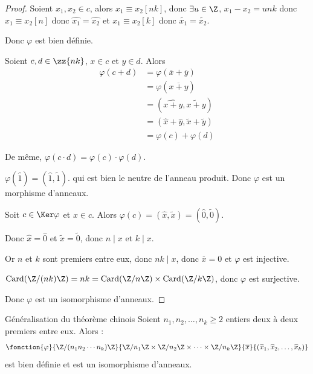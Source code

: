 \begin{proof}
    Soient $x_1, x_2 \in c$, alors $x_1 \equiv x_2 [nk]$, donc $\exists u \in \Z$, 
    $x_1 - x_2 = unk$ donc $x_1 \equiv x_2 [n]$ donc $\widehat{x_1} = \widehat{x_2}$ 
    et $x_1 \equiv x_2 [k]$ donc $\widetilde{x_1} = \widetilde{x_2}$.

    Donc $\varphi$ est bien définie.

    \avspace Soient $c, d \in \zz {nk}$, $x \in c$ et $y \in d$. Alors 
    \begin{align*}
        \varphi(c + d) & = \varphi(\overline x + \overline y) \\
        & = \varphi(\overline{x + y}) \\
        & = (\widehat{x + y}, \widetilde{x + y}) \\
        & = (\widehat x + \widehat y, \widetilde x + \widetilde y) \\
        & = \varphi(c) + \varphi(d)
    \end{align*}

    De même, $\varphi(c \cdot d) = \varphi(c) \cdot \varphi(d)$.

    $\varphi(\widehat 1) = (\widehat 1, \widetilde 1)$. qui est bien le neutre de l'anneau 
    produit. Donc $\varphi$ est un morphisme d'anneaux.

    \lvspace Soit $c \in \Ker \varphi$ et $x \in c$. 
    Alors $\varphi(c) = (\widehat x, \widetilde x) = (\widehat 0, \widetilde 0)$.

    Donc $\widehat x = \widehat 0$ et $\widetilde x = \widetilde 0$, donc $n \mid x $ et $k \mid x$.

    Or $n$ et $k$ sont premiers entre eux, donc $nk \mid x$, donc $\overline x = 0$ et 
    $\varphi$ est injective.

    $\operatorname{Card}(\Z / (nk) \Z) = nk = \operatorname{Card}(\Z / n \Z) \times \operatorname{Card}(\Z / k \Z)$, donc
    $\varphi$ est surjective.

    Donc $\varphi$ est un isomorphisme d'anneaux.
\end{proof}

\begin{proposition}{Généralisation du théorème chinois}{}
    Soient $n_1, n_2, \ldots, n_k \geqslant 2$ entiers deux à deux premiers entre eux. 
    Alors : \[\fonction{\varphi}{\Z / (n_1 n_2 \cdots n_k) \Z}{\Z / n_1 \Z \times \Z / n_2 \Z \times \cdots \times \Z / n_k \Z}{\overline x}{(\widehat x_1, \widehat x_2, \ldots, \widehat x_k)}\]
    est bien définie et est un isomorphisme d'anneaux.
\end{proposition}

